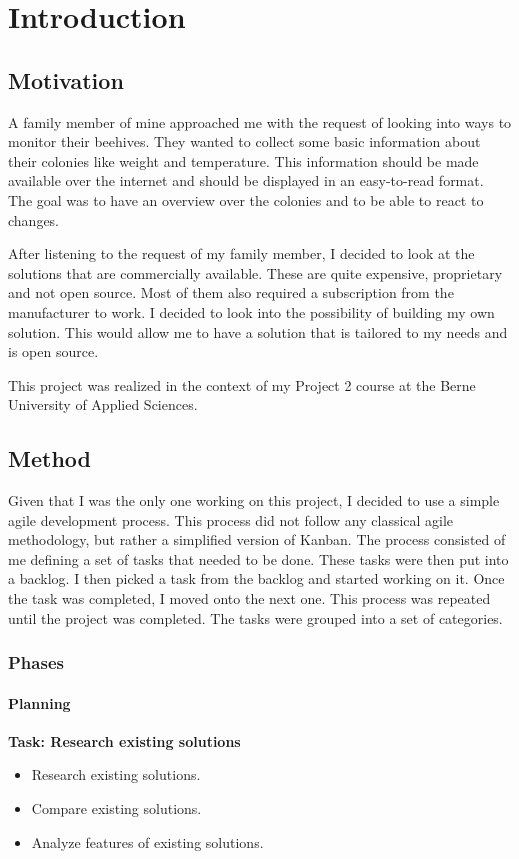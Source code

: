 \chapter{Introduction}

\section{Motivation}
A family member of mine approached me with the request of looking into ways to monitor their beehives. They wanted to collect some basic information about their colonies like weight and temperature. This information should be made available over the internet and should be displayed in an easy-to-read format. The goal was to have an overview over the colonies and to be able to react to changes.

After listening to the request of my family member, I decided to look at the solutions that are commercially available. These are quite expensive, proprietary and not open source. Most of them also required a subscription from the manufacturer to work. I decided to look into the possibility of building my own solution. This would allow me to have a solution that is tailored to my needs and is open source.

This project was realized in the context of my Project 2 course at the Berne University of Applied Sciences.

\newpage
\section{Method}
Given that I was the only one working on this project, I decided to use a simple \gls{agile} development process. This process did not follow any classical agile methodology, but rather a simplified version of \gls{Kanban}. The process consisted of me defining a set of tasks that needed to be done. These tasks were then put into a \gls{backlog}. I then picked a task from the backlog and started working on it. Once the task was completed, I moved onto the next one. This process was repeated until the project was completed.
The tasks were grouped into a set of categories.

\subsection{Phases}

\subsubsection{Planning}
\textbf{Task: Research existing solutions}
\begin{itemize}
    \item Research existing solutions.
    \item Compare existing solutions.
    \item Analyze features of existing solutions.
\end{itemize}


